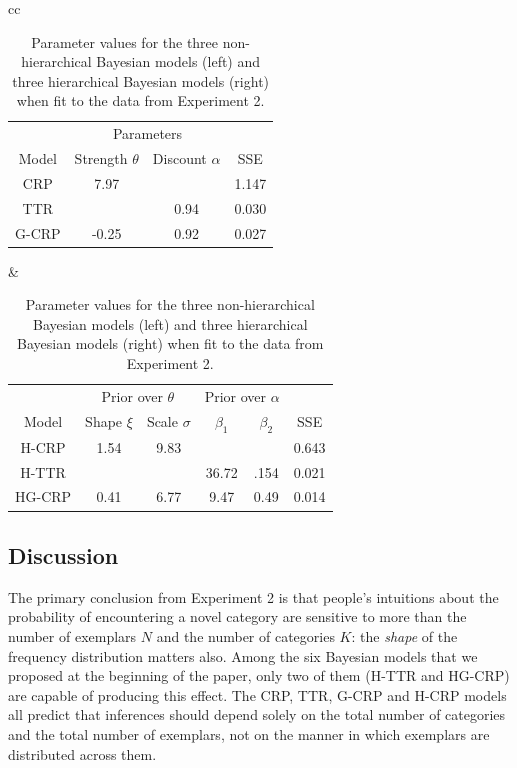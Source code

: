 \documentclass[doc]{apa6}
\begin{document}
\begin{table}[t]
\caption{Parameter values for the three non-hierarchical Bayesian models (left) and three hierarchical Bayesian models (right) when fit to the data from Experiment 2.}
\label{exp2fits}
\vspace*{6pt}
\footnotesize
\begin{tabular}{cc}
\begin{tabular}{c|cc|c}
& \multicolumn{2}{c|}{Parameters} & \\
Model & Strength $\theta$ & Discount $\alpha$ & SSE \\ \hline
CRP & 7.97 &  & 1.147 \\
TTR &  & 0.94 & 0.030 \\
G-CRP & -0.25 & 0.92 & 0.027
\end{tabular}
&
\begin{tabular}{c|cc|cc|c}
& \multicolumn{2}{c|}{Prior over $\theta$} & \multicolumn{2}{c|}{Prior over $\alpha$}  \\
Model & Shape $\xi$ & Scale $\sigma$ & $\beta_1$ & $\beta_2$ & SSE \\ \hline
H-CRP & 1.54 & 9.83 & & & 0.643 \\
H-TTR & & & 36.72 & .154 & 0.021 \\
HG-CRP & 0.41 & 6.77 & 9.47 & 0.49 & 0.014
\end{tabular}
\end{tabular}
\end{table}

\subsection{Discussion}

The primary conclusion from Experiment 2 is that people's intuitions about the
probability of encountering a novel category are sensitive to more than the number of exemplars $N$ and the number of categories $K$: the {\it shape} of the frequency distribution matters also. Among the six Bayesian models that we proposed at the beginning of the paper, only two of them (H-TTR and HG-CRP) are capable of producing this effect. The CRP, TTR, G-CRP and H-CRP models all predict that inferences should depend solely on the total number of categories and the total number of exemplars, not on the manner in which exemplars are distributed across them.
\end{document}
